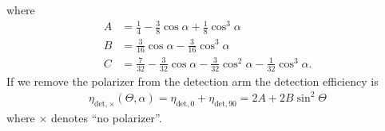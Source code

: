 \documentclass[11pt]{article}
\begin{document}
where
\vspace{-1em}
\begin{subequations}
\begin{align}
  A &= \frac{1}{4} - \frac{3}{8} \cos{\alpha } + \frac{1}{8} \cos^{3}{\alpha }\\
  B &= \frac{3}{16} \cos{\alpha } - \frac{3}{16} \cos^{3}{\alpha }\\
  C &= \frac{7}{32} - \frac{3}{32} \cos{\alpha } - \frac{3}{32} \cos^{2}{\alpha } - \frac{1}{32} \cos^{3}{\alpha}.
\end{align}\label{eq:coeff2}%
\end{subequations}
If we remove the polarizer from the detection arm the detection efficiency is
\begin{align}
  \eta_{\text{det},\times}(\Theta, \alpha) = \eta_{\text{det},0} + \eta_{\text{det},90} = 2A + 2B\sin^2\Theta
\end{align}
where $\times$ denotes ``no polarizer''.
\end{document}
